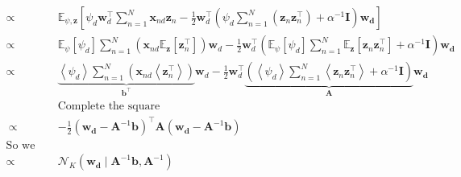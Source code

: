 \documentclass{article}
\begin{document}
\begin{align}
	\propto& \mathbb{E}_{\psi, \mathbf{z}}\left[\psi_d\mathbf{w}_d^\top\sum_{n=1}^{N}\mathbf{x}_{nd}\mathbf{z}_{n}-\frac{1}{2}\mathbf{w}_d^\top\left( \psi_d\sum_{n=1}^{N}\left( \mathbf{z}_{n}\mathbf{z}_{n}^\top\right)  + \alpha^{-1}\mathbf{I}\right) \mathbf{w_d} \right] \\
	\propto& \mathbb{E}_{\psi}[\psi_d]\sum_{n=1}^{N}(\mathbf{x}_{nd}\mathbb{E}_{\mathbf{z}}[\mathbf{z}_{n}^\top])\mathbf{w}_d-\frac{1}{2}\mathbf{w}_d^\top\left(\mathbb{E}_{\psi} [\psi_d]\sum_{n=1}^{N} \mathbb{E}_{\mathbf{z}}[\mathbf{z}_{n}\mathbf{z}_{n}^\top]+ \alpha^{-1}\mathbf{I}\right) \mathbf{w_d} \\
	\propto& \underbrace{\left\langle \psi_d\right\rangle \sum_{n=1}^{N}(\mathbf{x}_{nd}\left\langle \mathbf{z}_{n}^\top\right\rangle )}_{\mathbf{b}^\top}\mathbf{w}_d-\frac{1}{2}\mathbf{w}_d^\top\underbrace{\left( \left\langle \psi_d\right\rangle \sum_{n=1}^{N} \left\langle \mathbf{z}_{n}\mathbf{z}_{n}^\top\right\rangle + \alpha^{-1}\mathbf{I}\right)}_{\mathbf{A}} \mathbf{w_d} \\
	& \text{Complete the square}\\\
	\propto & -\frac{1}{2}\left( \mathbf{w_d} - \mathbf{A}^{-1}\mathbf{b}\right) ^\top \mathbf{A}\left( \mathbf{w_d} - \mathbf{A}^{-1}\mathbf{b}\right)\\
	\text{So we can conclude that}\\
	\propto& \mathcal{N}_K(\mathbf{w_d} \mid \mathbf{A}^{-1}\mathbf{b}, \mathbf{A}^{-1})\\
\end{align}
\end{document}
